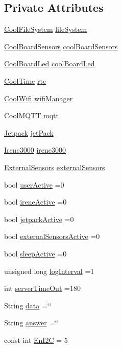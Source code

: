 \subsection*{Private Attributes}
\begin{DoxyCompactItemize}
\item 
\hyperlink{classCoolFileSystem}{Cool\+File\+System} \hyperlink{classCoolBoard_a42c2586fbb13ff7f06538e9284e8538d}{file\+System}
\item 
\hyperlink{classCoolBoardSensors}{Cool\+Board\+Sensors} \hyperlink{classCoolBoard_af102be5288bd7f7a8e59b13f86e26a00}{cool\+Board\+Sensors}
\item 
\hyperlink{classCoolBoardLed}{Cool\+Board\+Led} \hyperlink{classCoolBoard_a1b1d3c684a5baa56b08486e192fd8e97}{cool\+Board\+Led}
\item 
\hyperlink{classCoolTime}{Cool\+Time} \hyperlink{classCoolBoard_a50d2a6716879d64a85f3c6b44ad63275}{rtc}
\item 
\hyperlink{classCoolWifi}{Cool\+Wifi} \hyperlink{classCoolBoard_acd88e6003606b47479ebba81e4aceeca}{wifi\+Manager}
\item 
\hyperlink{classCoolMQTT}{Cool\+M\+Q\+TT} \hyperlink{classCoolBoard_a2399f44d7c23c1149a335cb3b46d90f1}{mqtt}
\item 
\hyperlink{classJetpack}{Jetpack} \hyperlink{classCoolBoard_a30b1357881b01ccbec676856a91e48e9}{jet\+Pack}
\item 
\hyperlink{classIrene3000}{Irene3000} \hyperlink{classCoolBoard_ad103718ce316006c4695b8eb312eaf11}{irene3000}
\item 
\hyperlink{classExternalSensors}{External\+Sensors} \hyperlink{classCoolBoard_a09e26264839c65873eb56af476eff6b2}{external\+Sensors}
\item 
bool \hyperlink{classCoolBoard_a6395459131d6889a3005f79c7a35e964}{user\+Active} =0
\item 
bool \hyperlink{classCoolBoard_a9c3f7ac625481ee2ae802a25d97a4ae0}{irene\+Active} =0
\item 
bool \hyperlink{classCoolBoard_a9be03a913d26e558328935ca3b59a75e}{jetpack\+Active} =0
\item 
bool \hyperlink{classCoolBoard_a638b00b76aeb819ecfd4c10b8cdd7bb7}{external\+Sensors\+Active} =0
\item 
bool \hyperlink{classCoolBoard_a0a51b2287139f66c738101fb53139230}{sleep\+Active} =0
\item 
unsigned long \hyperlink{classCoolBoard_a84bc94413b64973e4aba8c467c97006c}{log\+Interval} =1
\item 
int \hyperlink{classCoolBoard_a7a8d8d3d316220cdd049cd63c1aa8fe6}{server\+Time\+Out} =180
\item 
String \hyperlink{classCoolBoard_a427fb753dd8575bdf821c70a5c63d695}{data} =\char`\"{}\char`\"{}
\item 
String \hyperlink{classCoolBoard_a7b835fafd449e5282f7f91d787a2dc15}{answer} =\char`\"{}\char`\"{}
\item 
const int \hyperlink{classCoolBoard_af1fe1376fc66f93dee80b327ca695377}{En\+I2C} = 5
\end{DoxyCompactItemize}


